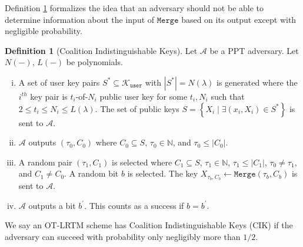 \documentclass{mrl}
\theoremstyle{definition}
\newtheorem{defn}[theorem]{Definition}
\begin{document}
Definition \ref{threshIndist} formalizes the idea that an adversary should not be able to determine information about the input of $\texttt{Merge}$ based on its output except with negligible probability. %

\begin{defn}[Coalition Indistinguishable Keys]\label{threshIndist} Let $\mathcal{A}$ be a PPT adversary. Let $N(-)$, $L(-)$ be polynomials.
\begin{enumerate}[(i)]
\item A set of user key pairs $S^* \subseteq \mathcal{K}_{\texttt{user}}$ with $\left|S^*\right|=N(\lambda)$ is generated where the $i^{th}$ key pair is $t_i$-of-$N_i$ public user key for some $t_i, N_i$ such that $2 \leq t_i \leq N_i \leq L(\lambda)$. The set of public keys $S = \left\{X_i \mid \exists (x_i, X_i) \in S^*\right\}$ is sent to $\mathcal{A}$.

\item $\mathcal{A}$ outputs $(\tau_0,C_0)$ where $C_0 \subseteq S$, $\tau_0 \in \mathbb{N}$, and $\tau_0 \leq \left|C_0\right|$.

\item A random pair $(\tau_1, C_1)$ is selected where $C_1 \subseteq S$, $\tau_1 \in \mathbb{N}$, $\tau_1 \leq \left|C_1\right|$, $\tau_0 \neq \tau_1$, and $C_1 \neq C_0$. A random bit $b$ is selected. The key $X_{\tau_b,C_b} \leftarrow \texttt{Merge}(\tau_b, C_b)$ is sent to $\mathcal{A}$.

\item $\mathcal{A}$ outputs a bit $b^{\prime}$. This counts as a success if $b=b^{\prime}$.
\end{enumerate}
We say an OT-LRTM scheme has Coalition Indistinguishable Keys (CIK) if the adversary can succeed with probability only negligibly more than $1/2$.
\end{defn}

\end{document}
